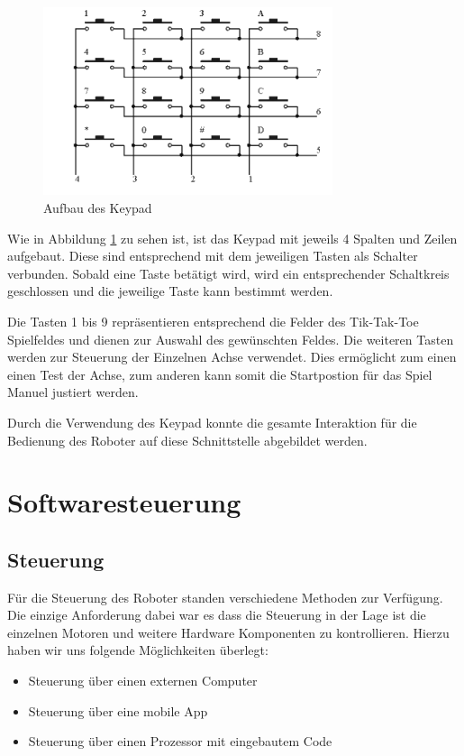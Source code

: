 \documentclass[conference,compsoc,final,a4paper]{IEEEtran}
\begin{document}
\begin{figure}[h]
\includegraphics[width=8.5cm]{../images/keypad.png}
\caption{Aufbau des Keypad \autocite{freenoveTutorial}}\label{Elektrik:Keypad}
\end{figure}

Wie in Abbildung \ref{Elektrik:Keypad} zu sehen ist, ist das Keypad mit jeweils 4 Spalten und Zeilen aufgebaut. Diese sind entsprechend mit dem jeweiligen Tasten als Schalter verbunden. 
Sobald eine Taste betätigt wird, wird ein entsprechender Schaltkreis geschlossen und die jeweilige Taste kann bestimmt werden.

Die Tasten 1 bis 9 repräsentieren entsprechend die Felder des Tik-Tak-Toe Spielfeldes und dienen zur Auswahl des gewünschten Feldes. 
Die weiteren Tasten werden zur Steuerung der Einzelnen Achse verwendet.
Dies ermöglicht zum einen einen Test der Achse, zum anderen kann somit die Startpostion für das Spiel Manuel justiert werden.

Durch die Verwendung des Keypad konnte die gesamte Interaktion für die Bedienung des Roboter auf diese Schnittstelle abgebildet werden.

\section{Softwaresteuerung}

\subsection{Steuerung}
Für die Steuerung des Roboter standen verschiedene Methoden zur Verfügung. Die einzige Anforderung dabei
war es dass die Steuerung in der Lage ist die einzelnen Motoren und weitere Hardware Komponenten
zu kontrollieren. Hierzu haben wir uns folgende Möglichkeiten überlegt:

\begin{itemize}
  \item Steuerung über einen externen Computer
  \item Steuerung über eine mobile App
  \item Steuerung über einen Prozessor mit eingebautem Code
\end{itemize}
\end{document}
